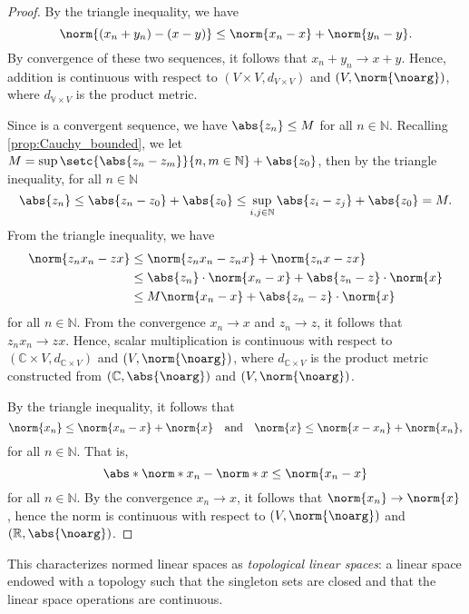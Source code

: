 \begin{proof}
    By the triangle inequality, we have
    \begin{equation*}
        \norm{(x_n + y_n) - (x - y)} \leq \norm{x_n - x} + \norm{y_n - y}.
    \end{equation*}
    By convergence of these two sequences, it follows that \(x_n + y_n \to x + y\). Hence, addition is continuous with respect to \((V \times V, d_{V\times V})\) and \((V, \norm{\noarg})\), where \(d_{\mathbb{V}\times V}\) is the product metric.

    Since  is a convergent sequence, we have \(\abs{z_n} \leq M\) for all \(n \in \mathbb{N}\). Recalling \cref{prop:Cauchy_bounded}, we let \(M = \sup\setc{\abs{z_n - z_m}}{n,m \in \mathbb{N}} + \abs{z_0}\), then by the triangle inequality, for all \(n \in \mathbb{N}\)
    \begin{equation*}
        \abs{z_n} \leq \abs{z_n - z_0} + \abs{z_0} \leq \sup_{i,j \in \mathbb{N}}{\abs{z_i - z_j}} + \abs{z_0} = M.
    \end{equation*}
    From the triangle inequality, we have
    \begin{align*}
        \norm{z_n x_n - zx} &\leq \norm{z_n x_n - z_n x} + \norm{z_n x - zx}\\
                            &\leq \abs{z_n}\cdot \norm{x_n - x} + \abs{z_n - z}\cdot \norm{x}\\
                            &\leq M \norm{x_n - x} + \abs{z_n - z}\cdot\norm{x}
    \end{align*}
    for all \(n \in \mathbb{N}\). From the convergence \(x_n \to x\) and \(z_n \to z\), it follows that \(z_n x_n \to zx\). Hence, scalar multiplication is continuous with respect to \((\mathbb{C} \times V, d_{\mathbb{C}\times V})\) and \((V, \norm{\noarg})\), where \(d_{\mathbb{C}\times V}\) is the product metric constructed from \((\mathbb{C}, \abs{\noarg})\) and \((V, \norm{\noarg})\).

    By the triangle inequality, it follows that
    \begin{equation*}
        \norm{x_n} \leq \norm{x_n - x} + \norm{x}\quad\text{and}\quad \norm{x} \leq \norm{x - x_n} + \norm{x_n},
    \end{equation*}
    for all \(n \in \mathbb{N}\). That is,
    \begin{equation*}
        \abs*{\norm*{x_n} - \norm*{x}} \leq \norm{x_n - x}
    \end{equation*}
    for all \(n \in \mathbb{N}\). By the convergence \(x_n \to x\), it follows that \(\norm{x_n} \to \norm{x}\), hence the norm is continuous with respect to \((V, \norm{\noarg})\) and \((\mathbb{R}, \abs{\noarg})\).
\end{proof}
\begin{remark}
    This characterizes normed linear spaces as \emph{topological linear spaces}: a linear space endowed with a topology such that the singleton sets are closed and that the linear space operations are continuous.
\end{remark}


